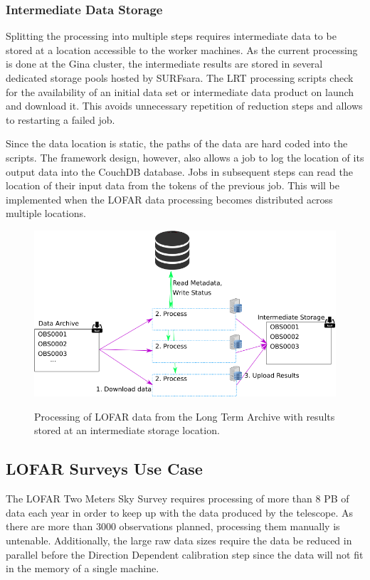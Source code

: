 \subsubsection{Intermediate Data Storage}\label{sec:intermediate_storage}

Splitting the processing into multiple steps requires intermediate data to be stored at a location accessible to the worker machines. As the current processing is done at the Gina cluster, the intermediate results are stored in several dedicated
storage pools hosted by SURFsara. The LRT processing scripts check for the availability of an initial data set or intermediate data product on launch and download it. This avoids unnecessary repetition of reduction steps and allows to restarting a failed job.

Since the data location is static, the paths of the data are hard coded into the scripts. The framework design, however, also allows a job to log the location of its output data into the CouchDB database. Jobs in subsequent steps can read the location of their input data from the tokens of the previous job. This will be implemented when the LOFAR data processing becomes distributed across multiple locations. 

\begin{figure}
 \includegraphics[width=.76\textwidth]{ch3/figures/Token_process.png}\\
 \caption{Processing of LOFAR data from the Long Term Archive with results stored at an intermediate storage location.}
 \label{fig:tok_process}
\end{figure}

\subsection{LOFAR Surveys Use Case}\label{sec:use}
The LOFAR Two Meters Sky Survey requires processing of more than 8 PB of data each year in order to keep up with the data produced by the telescope. As there are more than 3000 observations planned, processing them manually is untenable. Additionally, the large raw data sizes require the data be reduced in parallel before the Direction Dependent calibration step since the data will not fit in the memory of a single machine. 

